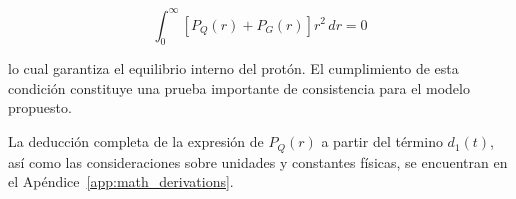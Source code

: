 \begin{equation}
\int_0^\infty [P_Q(r) + P_G(r)] r^2 \, dr = 0
\end{equation}

lo cual garantiza el equilibrio interno del prot\'on. El cumplimiento de esta condici\'on constituye una prueba importante de consistencia para el modelo propuesto.

\begin{remark}
    La deducci\'on completa de la expresi\'on de \( P_Q(r) \) a partir del t\'ermino \( d_1(t) \), as\'i como las consideraciones sobre unidades y constantes f\'isicas, se encuentran en el Ap\'endice~\ref{app:math_derivations}.
\end{remark}






